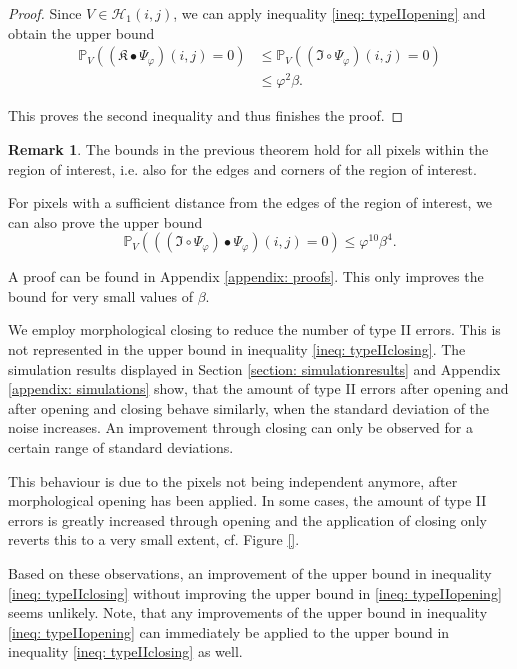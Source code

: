 \documentclass[a4paper,12pt]{article}
\theoremstyle{plain}
\theoremstyle{definition}
\newtheorem{remark}[theorem]{Remark}
\begin{document}
\begin{proof}
	Since $V \in \mathcal{H}_1(i, j)$, we can apply inequality \eqref{ineq: typeIIopening} and obtain the upper bound
	\begin{align*}
		\mathbb{P}_V\left( (\mathfrak{K} \bullet \Psi_\varphi)(i, j) = 0 \right) &\leq \mathbb{P}_V\left( (\mathfrak{I} \circ \Psi_\varphi)(i, j) = 0 \right) \\
		&\leq \varphi^2 \beta.
	\end{align*}
	
	This proves the second inequality and thus finishes the proof.
\end{proof}

\begin{remark}
	The bounds in the previous theorem hold for all pixels within the region of interest, i.e. also for the edges and corners of the region of interest.
	
	For pixels with a sufficient distance from the edges of the region of interest, we can also prove the upper bound
	\begin{equation*}
		\mathbb{P}_V\left( ((\mathfrak{I} \circ \Psi_\varphi) \bullet \Psi_\varphi)(i, j) = 0 \right) \leq \varphi^{10} \beta^4.
	\end{equation*}
	
	A proof can be found in Appendix \ref{appendix: proofs}. This only improves the bound for very small values of $\beta$.
\end{remark}

We employ morphological closing to reduce the number of type II errors. This is not represented in the upper bound in inequality \eqref{ineq: typeIIclosing}. The simulation results displayed in Section \ref{section: simulationresults} and Appendix \ref{appendix: simulations} show, that the amount of type II errors after opening and after opening and closing behave similarly, when the standard deviation of the noise increases. An improvement through closing can only be observed for a certain range of standard deviations.

This behaviour is due to the pixels not being independent anymore, after morphological opening has been applied. In some cases, the amount of type II errors is greatly increased through opening and the application of closing only reverts this to a very small extent, cf. Figure \ref{}.

Based on these observations, an improvement of the upper bound in inequality \eqref{ineq: typeIIclosing} without improving the upper bound in \eqref{ineq: typeIIopening} seems unlikely.
Note, that any improvements of the upper bound in inequality \eqref{ineq: typeIIopening} can immediately be applied to the upper bound in inequality \eqref{ineq: typeIIclosing} as well.
\end{document}
